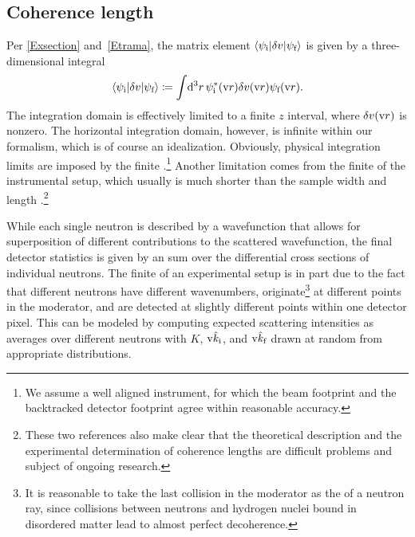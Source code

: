 \subsection{Coherence length}

Per \cref{Exsection} and~\cref{Etrama},
%
the matrix element $\left\langle \psi_{\text{i}}|\delta v|\psi_{\text{f}}\right\rangle$
is given by a three-dimensional integral
\begin{equation}\label{Etrama3}
  \left\langle \psi_{\text{i}}|\delta v|\psi_{\text{f}}\right\rangle
  \coloneqq  \int\!\mathrm d^3r\, \psi^{*}_{\text{i}}(\text{v}{r})\delta v(\text{v}{r})\psi_{\text{f}}(\text{v}{r}).
\end{equation}
The integration domain is effectively limited to a finite $z$ interval,
where $\delta v(\text{v}{r})$ is nonzero.
The horizontal integration domain, however, is infinite
within our formalism,
which is of course an idealization.
Obviously, physical integration limits are imposed by the finite
%
.\footnote
{We assume a well aligned instrument,
for which the beam footprint and the backtracked detector footprint
%
%
%
agree within reasonable accuracy.}
Another limitation comes from the finite 
of the instrumental setup,
which usually is much shorter than the sample width and length
\cite{HaPR10,MaMM14}.\footnote
{These two references also make clear that
  the theoretical description and the experimental determination of
  coherence lengths are difficult problems and subject of ongoing research.}

While each single neutron is described by a wavefunction
that allows for  superposition of
different contributions to the scattered wavefunction,
the final detector statistics
%
is given by an  sum
over the differential cross sections of individual neutrons.
The finite 
%
of an experimental setup is in part due to the fact that
different neutrons have different wavenumbers,
originate\footnote
{It is reasonable to take the last collision in the moderator
  as the  of a neutron ray,
  since collisions between neutrons and hydrogen nuclei bound in
  disordered matter lead to almost perfect decoherence.}
at different points in the moderator,
and are detected at slightly different points within one detector pixel.
This can be modeled by computing expected scattering intensities as
averages over different neutrons with
$K$, $\text{v}{\hat k}_{\text{i}}$, and $\text{v}{\hat k}_{\text{f}}$ drawn at random
from appropriate distributions.

